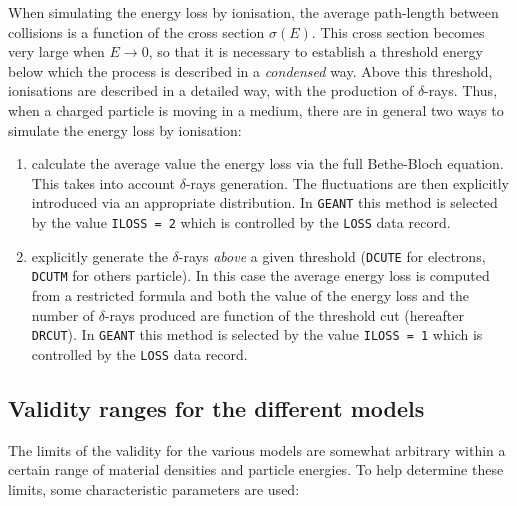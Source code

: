 When simulating the energy loss by ionisation, the average path-length
between collisions is a function of the cross section $\sigma(E)$.
This cross section becomes very large
when $E \rightarrow 0$, so that it is necessary
to establish a threshold energy below which the process is described in a
{\it condensed} way. Above this threshold, ionisations are
described in a detailed way, with the production of $\delta$-rays.
Thus, when a charged particle is moving in a medium, there are
in general two ways to simulate the energy loss by ionisation:
\begin{enumerate}
\item calculate the average value the energy loss 
via the full Bethe-Bloch equation. This takes into account
$\delta$-rays generation. The fluctuations are then explicitly
introduced via an appropriate distribution.
In {\tt GEANT} 
this method is selected by the value {\tt ILOSS = 2} which is
controlled by the {\tt LOSS} data record.
\item explicitly generate the $\delta$-rays {\it above} a given 
threshold ({\tt DCUTE} for electrons, {\tt DCUTM} for others particle).
In this case the average energy
loss is computed from a restricted formula and
both the value of the energy loss
and the number of $\delta$-rays
produced are function of the threshold cut (hereafter {\tt DRCUT}).
In {\tt GEANT} this method is selected by the value {\tt ILOSS = 1} which is
controlled by the {\tt LOSS} data record.
\end{enumerate}

\subsection{Validity ranges for the different models}
The limits of the validity for
the various models are somewhat arbitrary
within a certain range of material densities and particle energies.
To help determine these limits, some characteristic parameters are used:

